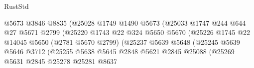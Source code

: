 \begin{lexlean}{RustStd}
\begin{coremodule}
                                          @5673
                                          @3846
                                          @8835
                                          (@25028
                                            @1749
                                            @1490
                                            @5673
                                            (@25033
                                              @1747
                                              @244
                                              @644
                                              @27
                                              @5671
                                              @2799
                                              (@25220
                                                @1743
                                                @22
                                                @324
                                                @5650
                                                @5670
                                                (@25226
                                                  @1745
                                                  @22
                                                  @14045
                                                  @5650
                                                  (@2781 @5670 @2799)
                                                  (@25237
                                                    @5639
                                                    @5648
                                                    (@25245
                                                      @5639
                                                      @5646
                                                      @3712
                                                      (@25255
                                                        @5638
                                                        @5645
                                                        @2848
                                                        @5621
                                                        @2845
                                                        @25088
                                                        (@25269
                                                          @5631
                                                          @2845
                                                          @25278
                                                          @25281
                                                          @8637

\end{coremodule}
\end{lexlean}
